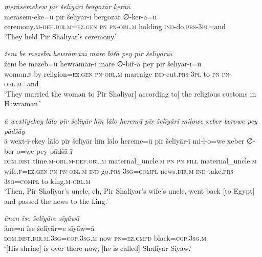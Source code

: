 \ea \label{ŽP.256}
\textit{merāsēmekew pīr šelīyārī bergozār kerāū} \\ 
\gll merāsēm-eke=ū pīr šelīyār-ī bergozār ∅-ker-ā=ū \\ 
 ceremony\textsc{.m}\textsc{-def}\textsc{.dir}\textsc{.m}\textsc{\textsc{=ez.gen}} \textsc{pn} \textsc{pn}\textsc{-obl}\textsc{.m} holding \textsc{ind-}do\textsc{.prs}\textsc{-3pl}=and \\ 
\glt `They held Pir Shaliyar’s ceremony.'
\z 
 
\ea \label{ŽP.257}
\textit{ženī be mezebū hewrāmānī māre biřā pey pīr šelīyārīū} \\ 
\gll ženī be mezeb=ū hewrāmān-ī māre ∅-biř-ā pey pīr šelīyār-ī=ū \\ 
 woman\textsc{.f} by religion\textsc{\textsc{=ez.gen}} \textsc{pn}\textsc{-obl}\textsc{.m} marraige \textsc{ind-}cut\textsc{.prs}\textsc{-3pl} to \textsc{pn} \textsc{pn}\textsc{-obl}\textsc{.m}=and \\ 
\glt `They married the woman to Pir Shaliyar] according to] the religious customs in Hawraman.'
\z 
 
\ea \label{ŽP.258}
\textit{ā wextīyekey lālo pīr šelīyār hīn lālo heremū pīr šelīyārī milowe xeber berowe pey pādšāy} \\ 
\gll ā wext-ī-ekey lālo pīr šelīyār hīn lālo hereme=ū pīr šelīyār-ī mi-l-o=we xeber ∅-ber-o=we pey pādšā-ī \\ 
 \textsc{dem.dist} time\textsc{.m}\textsc{-obl}\textsc{.m}\textsc{-def}\textsc{.obl}\textsc{.m} maternal\_uncle\textsc{.m} \textsc{pn} \textsc{pn} \textsc{fill} maternal\_uncle\textsc{.m} wife\textsc{.f}\textsc{\textsc{=ez.gen}} \textsc{pn} \textsc{pn}\textsc{-obl}\textsc{.m} \textsc{ind-}go\textsc{.prs}\textsc{-3sg}\textsc{=compl} news\textsc{.dir}\textsc{.m} \textsc{ind-}take\textsc{.prs}\textsc{-3sg}\textsc{=compl} to king\textsc{.m}\textsc{-obl}\textsc{.m} \\ 
\glt `Then, Pir Shaliyar’s uncle, eh, Pir Shaliyar’s wife’s uncle, went back [to Egypt] and passed the news to the king.'
\z 
 
\ea \label{ŽP.267}
\textit{ānen īse šelīyāre sīyāwā} \\ 
\gll āne=n īse šelīyār=e sīyāw=ā \\ 
 \textsc{dem.dist}\textsc{.dir}\textsc{.m}\textsc{.3sg}\textsc{=cop}\textsc{.3sg}\textsc{.m} now \textsc{pn}\textsc{=ez}\textsc{.cmpd} black\textsc{=cop}\textsc{.3sg}\textsc{.m} \\ 
\glt `[His shrine] is over there now; [he is called] Shaliyar Siyaw.'
\z 
 
